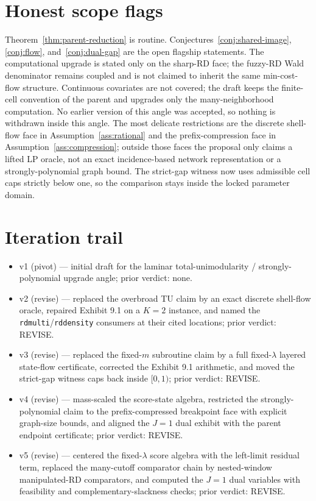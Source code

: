 \documentclass[11pt]{article}
\theoremstyle{definition}
\theoremstyle{plain}
\theoremstyle{remark}
\begin{document}
\section{Honest scope flags}
Theorem~\ref{thm:parent-reduction} is routine. Conjectures~\ref{conj:shared-image},
\ref{conj:flow}, and~\ref{conj:dual-gap} are the open flagship statements. The computational
upgrade is stated only on the sharp-RD face; the fuzzy-RD Wald denominator remains coupled and
is not claimed to inherit the same min-cost-flow structure. Continuous covariates are not
covered; the draft keeps the finite-cell convention of the parent and upgrades only the
many-neighborhood computation. No earlier version of this angle was accepted, so nothing is
withdrawn inside this angle. The most delicate restrictions are the discrete shell-flow face in
Assumption~\ref{ass:rational} and the prefix-compression face in
Assumption~\ref{ass:compression}; outside those faces the proposal only claims a lifted LP
oracle, not an exact incidence-based network representation or a strongly-polynomial graph bound.
The strict-gap witness now uses admissible cell caps strictly below one, so the comparison stays
inside the locked parameter domain.

\section{Iteration trail}
\begin{itemize}[leftmargin=*]
  \item v1 (pivot) --- initial draft for the laminar total-unimodularity / strongly-polynomial upgrade angle; prior verdict: none.
  \item v2 (revise) --- replaced the overbroad TU claim by an exact discrete shell-flow oracle, repaired Exhibit 9.1 on a \(K=2\) instance, and named the \texttt{rdmulti}/\texttt{rddensity} consumers at their cited locations; prior verdict: REVISE.
  \item v3 (revise) --- replaced the fixed-\(m\) subroutine claim by a full fixed-\(\lambda\) layered state-flow certificate, corrected the Exhibit 9.1 arithmetic, and moved the strict-gap witness caps back inside \([0,1)\); prior verdict: REVISE.
  \item v4 (revise) --- mass-scaled the score-state algebra, restricted the strongly-polynomial claim to the prefix-compressed breakpoint face with explicit graph-size bounds, and aligned the \(J=1\) dual exhibit with the parent endpoint certificate; prior verdict: REVISE.
  \item v5 (revise) --- centered the fixed-\(\lambda\) score algebra with the left-limit residual term, replaced the many-cutoff comparator chain by nested-window manipulated-RD comparators, and computed the \(J=1\) dual variables with feasibility and complementary-slackness checks; prior verdict: REVISE.
\end{itemize}
\end{document}
